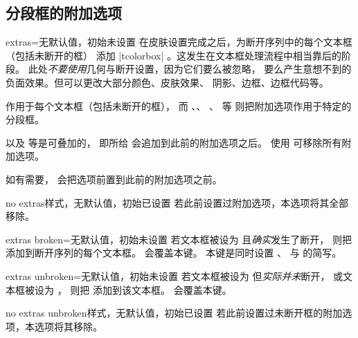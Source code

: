 \clearpage
\subsection{分段框的附加选项}\label{subsec:extras}


\begin{docTcbKey}[][doc new=2015-07-16]{extras}{=}{无默认值，初始未设置}
  在皮肤设置完成之后，为断开序列中的每个文本框（包括未断开的框）
  添加 |tcolorbox| 。这发生在文本框处理流程中相当靠后的阶段。
  此处\emph{不要使用}几何与断开设置，因为它们要么被忽略，
  要么产生意想不到的负面效果。但可以更改大部分颜色、皮肤效果、
  阴影、边框、边框代码等。\par
   作用于每个文本框（包括未断开的框），
  而 、、
  、 等
  则把附加选项作用于特定的分段框。\par
   以及  等是可叠加的，
  即所给  会追加到此前的附加选项之后。
  使用  可移除所有附加选项。\par
  如有需要， 会把选项前置到此前的附加选项之前。
\end{docTcbKey}


\begin{docTcbKey}[][doc new=2015-07-16]{no extras}{}{样式，无默认值，初始已设置}
  若此前设置过附加选项，本选项将其全部移除。
\end{docTcbKey}


\begin{docTcbKey}[][doc new=2015-07-16]{extras broken}{=}{无默认值，初始未设置}
  若文本框被设为  且\emph{确实}发生了断开，
  则把  添加到断开序列的每个文本框。
   会覆盖本键。
  本键是同时设置 、
  与  的简写。
\end{docTcbKey}

\begin{docTcbKey}[][doc new=2015-07-16]{extras unbroken}{=}{无默认值，初始未设置}
  若文本框被设为  但\emph{实际并未}断开，
  或文本框被设为 ，
  则把  添加到该文本框。
   会覆盖本键。
\end{docTcbKey}

\begin{docTcbKey}[][doc new=2015-07-16]{no extras unbroken}{}{样式，无默认值，初始已设置}
  若此前设置过未断开框的附加选项，本选项将其移除。
\end{docTcbKey}

